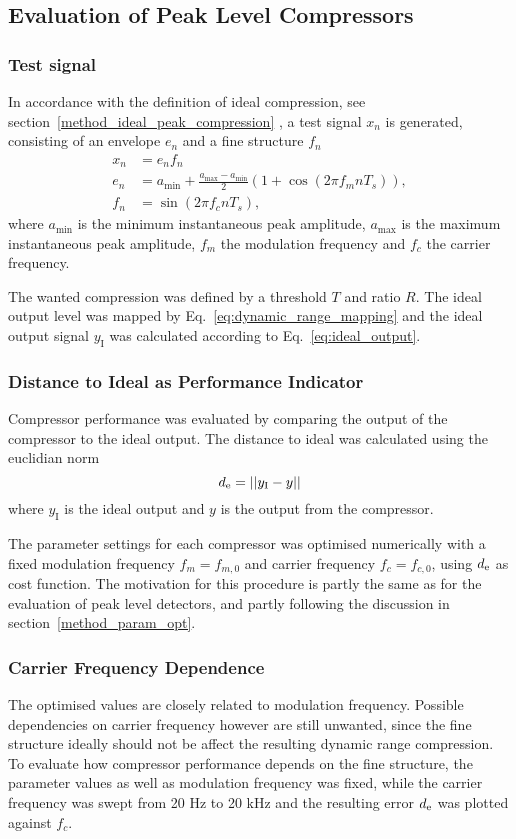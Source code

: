 \documentclass[../main2.tex]{subfiles}
\begin{document}
\subsection{Evaluation of Peak Level Compressors}\label{method_peak_compressors}
\subsubsection{Test signal}
In accordance with the definition of ideal compression, see section~\ref{method_ideal_peak_compression}
, a test signal $x_n$ is generated, consisting of an envelope $e_n$ and a fine structure $f_n$
\begin{equation}
\begin{split}
	x_n &=e_nf_n\\
	e_n &= a_\text{min} + \frac{a_\text{max}- a_\text{min}}{2} \left(1 + \cos(2 \pi f_m n T_s) \right), \\
	f_n &= \sin(2 \pi f_c n T_s),
\end{split} \label{eq:test_signal}
\end{equation}
where $a_\text{min}$ is the minimum instantaneous peak amplitude, $a_\text{max}$ is the maximum instantaneous peak amplitude, $f_m$ the modulation frequency and $f_c$ the carrier frequency.

The wanted compression was defined by a threshold $T$ and ratio $R$. The ideal output level was mapped by Eq.~\eqref{eq:dynamic_range_mapping} and the ideal output signal $y_\text{I}$ was calculated according to Eq.~\eqref{eq:ideal_output}.

\subsubsection{Distance to Ideal as Performance Indicator}
Compressor performance was evaluated by comparing the output of the compressor to the ideal output. The distance to ideal was calculated using the euclidian norm
\begin{equation}
d_\text{e} = ||y_\text{I} - y||
\end{equation}
where $y_\text{I}$ is the ideal output and $y$ is the output from the compressor.

The parameter settings for each compressor was optimised numerically with a fixed modulation frequency $f_m = f_{m,0}$ and carrier frequency $f_c = f_{c,0}$, using $d_\text{e}$ as cost function. The motivation for this procedure is partly the same as for the evaluation of peak level detectors, and partly following the discussion in section~\ref{method_param_opt}.

\subsubsection{Carrier Frequency Dependence}
The optimised values are closely related to modulation frequency. Possible dependencies on carrier frequency however are still unwanted, since the fine structure ideally should not be affect the resulting dynamic range compression. To evaluate how compressor performance depends on the fine structure, the parameter values as well as modulation frequency was fixed, while the carrier frequency was swept from 20 Hz to 20 kHz and the resulting error $d_\text{e}$ was plotted against $f_c$.
\end{document}
